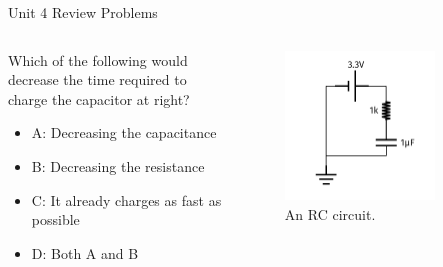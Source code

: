 \documentclass{beamer}
\begin{document}
\begin{frame}{Unit 4 Review Problems}
\begin{columns}[T]
\begin{column}{0.5\textwidth}
Which of the following would decrease the time required to charge the capacitor at right?
\begin{itemize}
\item A: Decreasing the capacitance
\item B: Decreasing the resistance
\item C: It already charges as fast as possible
\item D: Both A and B
\end{itemize}
\end{column}
\begin{column}{0.5\textwidth}
\begin{figure}
\centering
\includegraphics[width=0.8\textwidth]{figures/iVCurve7.pdf}
\caption{\label{fig:RC0} An RC circuit.}
\end{figure}
\end{column}
\end{columns}
\end{frame}
\end{document}
